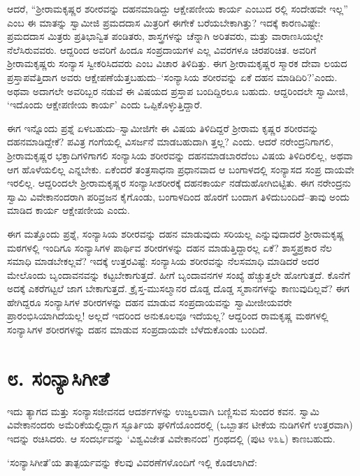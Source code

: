 ಆದರೆ, “ಶ್ರೀರಾಮಕೃಷ್ಣರ ಶರೀರವನ್ನು ದಹನಮಾಡಿದ್ದು ಆಕ್ಷೇಪಣೀಯ ಕಾರ್ಯ ಎಂಬುದ ರಲ್ಲಿ ಸಂದೇಹವೇ ಇಲ್ಲ” ಎಂಬ ಈ ಮಾತನ್ನು ಸ್ವಾಮೀಜಿ ಪ್ರಮದದಾಸ ಮಿತ್ರರಿಗೆ ಈಗೇಕೆ ಬರೆಯಬೇಕಾಗಿತ್ತು? ಇದಕ್ಕೆ ಕಾರಣವಿಷ್ಟೇ: ಪ್ರಮದದಾಸ ಮಿತ್ರರು ಪ್ರತಿಭಾನ್ವಿತ ಪಂಡಿತರು, ಶಾಸ್ತ್ರಗಳನ್ನು ಚೆನ್ನಾಗಿ ಅರಿತವರು, ಮತ್ತು ವಾರಾಣಸಿಯಲ್ಲೇ ನೆಲೆಸಿರುವವರು. ಆದ್ದರಿಂದ ಅವರಿಗೆ ಹಿಂದೂ ಸಂಪ್ರದಾಯಗಳ ಎಲ್ಲ ವಿವರಗಳೂ ಚಿರಪರಿಚಿತ. ಅವರಿಗೆ ಶ್ರೀರಾಮಕೃಷ್ಣರು ಸಂನ್ಯಾಸ ಸ್ವೀಕರಿಸಿದವರು ಎಂಬ ವಿಚಾರ ತಿಳಿದಿತ್ತು. ಈಗ ಶ್ರೀರಾಮಕೃಷ್ಣರ ಸ್ಮಾರಕ ದೇವಾ ಲಯದ ಪ್ರಸ್ತಾಪವೆತ್ತಿದಾಗ ಅವರು ಆಕ್ಷೇಪಣೆಯೆತ್ತಬಹುದು–‘ಸಂನ್ಯಾಸಿಯ ಶರೀರವನ್ನು ಏಕೆ ದಹನ ಮಾಡಿದಿರಿ?’ಎಂದು. ಅಥವಾ ಅದಾಗಲೇ ಅವರಿಬ್ಬರ ನಡುವೆ ಈ ವಿಷಯದ ಪ್ರಸ್ತಾಪ ಬಂದಿದ್ದಿರಲೂ ಬಹುದು. ಆದ್ದರಿಂದಲೇ ಸ್ವಾಮೀಜಿ, ‘ಇದೊಂದು ಆಕ್ಷೇಪಣೀಯ ಕಾರ್ಯ’ ಎಂದು ಒಪ್ಪಿಕೊಳ್ಳುತ್ತಿದ್ದಾರೆ.

ಈಗ ಇನ್ನೊಂದು ಪ್ರಶ್ನೆ ಏಳಬಹುದು–ಸ್ವಾಮೀಜಿಗೇ ಈ ವಿಷಯ ತಿಳಿದಿದ್ದರೆ ಶ್ರೀರಾಮ ಕೃಷ್ಣರ ಶರೀರವನ್ನು ದಹನಮಾಡಿದ್ದೇಕೆ? ಪವಿತ್ರ ಗಂಗೆಯಲ್ಲಿ ವಿಸರ್ಜನೆ ಮಾಡಬಹುದಾಗಿ ತ್ತಲ್ಲ? ಎಂದು. ಆದರೆ ನರೇಂದ್ರನಿಗಾಗಲಿ, ಶ್ರೀರಾಮಕೃಷ್ಣರ ಭಕ್ತಾದಿಗಳಿಗಾಗಲಿ ಸಂನ್ಯಾಸಿಯ ಶರೀರವನ್ನು ದಹನಮಾಡಬಾರದೆಂಬ ವಿಷಯ ತಿಳಿದಿರಲಿಲ್ಲ, ಅಥವಾ ಆಗ ಹೊಳೆಯಲಿಲ್ಲ ಎನ್ನಬೇಕು. ಏಕೆಂದರೆ ತಂತ್ರಸಾಧನಾ ಪ್ರಧಾನವಾದ ಆ ಬಂಗಾಳದಲ್ಲಿ ಸಂನ್ಯಾಸದ ಸಂಪ್ರ ದಾಯವೇ ಇರಲಿಲ್ಲ. ಆದ್ದರಿಂದಲೇ ಶ್ರೀರಾಮಕೃಷ್ಣರ ಸಂನ್ಯಾಸೀಶರೀರಕ್ಕೆ ದಹನಕಾರ್ಯ ನಡೆದುಹೋಗಿಬಿಟ್ಟಿತು. ಈಗ ನರೇಂದ್ರನು ಸ್ವಾಮಿ ವಿವೇಕಾನಂದರಾಗಿ ಪರಿವ್ರಜನ ಕೈಗೊಂಡು, ಬಂಗಾಳದಿಂದ ಹೊರಗೆ ಬಂದಾಗ ತಿಳಿದುಬಂದಿದೆ–ತಾವು ಅಂದು ಮಾಡಿದ ಕಾರ್ಯ ಆಕ್ಷೇಪಣೀಯ ಎಂದು.

ಈಗ ಮತ್ತೊಂದು ಪ್ರಶ್ನೆ, ಸಂನ್ಯಾಸಿಯ ಶರೀರವನ್ನು ದಹನ ಮಾಡುವುದು ಸರಿಯಲ್ಲ ಎನ್ನುವುದಾದರೆ ಶ್ರೀರಾಮಕೃಷ್ಣ ಮಠಗಳಲ್ಲಿ ಇಂದಿಗೂ ಸಂನ್ಯಾಸಿಗಳ ಪಾರ್ಥಿವ ಶರೀರಗಳನ್ನು ದಹನ ಮಾಡುತ್ತಿದ್ದಾರಲ್ಲ ಏಕೆ? ಶಾಸ್ತ್ರಪ್ರಕಾರ ನೆಲ ಸಮಾಧಿ ಮಾಡಬೇಕಲ್ಲವೆ? ಇದಕ್ಕೆ ಉತ್ತರವಿಷ್ಟೆ: ಸಂನ್ಯಾಸಿಯ ಶರೀರವನ್ನು ನೆಲಸಮಾಧಿ ಮಾಡಿದರೆ ಅದರ ಮೇಲೊಂದು ಬೃಂದಾವನವನ್ನು ಕಟ್ಟಬೇಕಾಗುತ್ತದೆ. ಹೀಗೆ ಬೃಂದಾವನಗಳ ಸಂಖ್ಯೆ ಹೆಚ್ಚುತ್ತಲೇ ಹೋಗುತ್ತದೆ. ಕೊನೆಗೆ ಅದಕ್ಕೆ ಎಕರೆಗಟ್ಟಲೆ ಜಾಗ ಬೇಕಾಗುತ್ತದೆ. ಕ್ರೈಸ್ತ-ಮುಸಲ್ಮಾನರ ದೊಡ್ಡ ದೊಡ್ಡ ಸ್ಮಶಾನಗಳನ್ನು ಕಾಣುವುದಿಲ್ಲವೆ? ಈಗ ಹೇಗಿದ್ದರೂ ಸಂನ್ಯಾಸಿಗಳ ಶರೀರಗಳನ್ನು ದಹನ ಮಾಡುವ ಸಂಪ್ರದಾಯವನ್ನು ಸ್ವಾಮೀಜೀಯವರೇ ಪ್ರಾರಂಭಿಸಿಯಾಗಿದೆಯಲ್ಲ! ಅಲ್ಲದೆ ಇದರಿಂದ ಅನುಕೂಲವೂ ಇದೆಯಲ್ಲ? ಆದ್ದರಿಂದ ರಾಮಕೃಷ್ಣ ಮಠಗಳಲ್ಲಿ ಸಂನ್ಯಾಸಿಗಳ ಶರೀರಗಳನ್ನು ದಹನ ಮಾಡುವ ಸಂಪ್ರದಾಯವೇ ಬೆಳೆದುಕೊಂಡು ಬಂದಿದೆ.


\section{೮. ಸಂನ್ಯಾಸಿಗೀತೆ}

ಇದು ತ್ಯಾಗದ ಮತ್ತು ಸಂನ್ಯಾಸಜೀವನದ ಆದರ್ಶಗಳನ್ನು ಉಜ್ವಲವಾಗಿ ಬಣ್ಣಿಸುವ ಸುಂದರ ಕವನ. ಸ್ವಾಮಿ ವಿವೇಕಾನಂದರು ಅಮೆರಿಕೆಯಲ್ಲಿದ್ದಾಗ ಸ್ಫೂರ್ತಿಯ ಘಳಿಗೆಯೊಂದರಲ್ಲಿ (ಒಬ್ಬಾತನ ಟೀಕೆಯ ನುಡಿಗಳಿಗೆ ಉತ್ತರವಾಗಿ) ಇದನ್ನು ರಚಿಸಿದರು. ಆ ಸಂದರ್ಭವನ್ನು ‘ವಿಶ್ವವಿಜೇತ ವಿವೇಕಾನಂದ’ ಗ್ರಂಥದಲ್ಲಿ (ಪುಟ ೪೩೬) ಕಾಣಬಹುದು.

‘ಸಂನ್ಯಾಸಿಗೀತೆ’ಯ ತಾತ್ಪರ್ಯವನ್ನು ಕೆಲವು ವಿವರಣೆಗಳೊಂದಿಗೆ ಇಲ್ಲಿ ಕೊಡಲಾಗಿದೆ:

